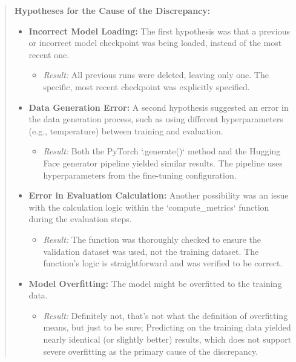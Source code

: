 \documentclass{article}
\begin{document}
\begin{quote}
\footnotesize{
\textbf{Hypotheses for the Cause of the Discrepancy:}
\begin{itemize}
    \item \textbf{Incorrect Model Loading:} The first hypothesis was that a previous or incorrect model checkpoint was being loaded, instead of the most recent one.
        \begin{itemize}
            \item \textit{Result:} All previous runs were deleted, leaving only one. The specific, most recent checkpoint was explicitly specified.
        \end{itemize}

    \item \textbf{Data Generation Error:} A second hypothesis suggested an error in the data generation process, such as using different hyperparameters (e.g., temperature) between training and evaluation.
        \begin{itemize}
            \item \textit{Result:} Both the PyTorch `.generate()` method and the Hugging Face generator pipeline yielded similar results. The pipeline uses hyperparameters from the fine-tuning configuration.
        \end{itemize}

    \item \textbf{Error in Evaluation Calculation:} Another possibility was an issue with the calculation logic within the `compute\_metrics` function during the evaluation steps.
        \begin{itemize}
            \item \textit{Result:} The function was thoroughly checked to ensure the validation dataset was used, not the training dataset. The function's logic is straightforward and was verified to be correct.
        \end{itemize}

    \item \textbf{Model Overfitting:} The model might be overfitted to the training data.
        \begin{itemize}
            \item \textit{Result:} Definitely not, that's not what the definition of overfitting means, but just to be sure; Predicting on the training data yielded nearly identical (or slightly better) results, which does not support severe overfitting as the primary cause of the discrepancy.
        \end{itemize}
    

\end{itemize}}
\end{quote}
\end{document}
